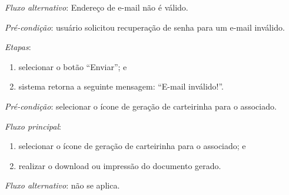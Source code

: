 \documentclass[a4paper,12pt]{article}
\begin{document}
\noindent \textit{Fluxo alternativo}: Endereço de e-mail não é válido.

\noindent \textit{Pré-condição}: usuário solicitou recuperação de senha para um e-mail inválido.

\noindent \textit{Etapas}:

\begin{enumerate}
    \item selecionar o botão ``Enviar''; e
    \item sistema retorna a seguinte mensagem: ``E-mail inválido!''.
\end{enumerate}



\vspace{0.7cm}

\noindent \textit{Pré-condição}: selecionar o ícone de geração de carteirinha para o associado.

\noindent \textit{Fluxo principal}:

\begin{enumerate}
    \item selecionar o ícone de geração de carteirinha para o associado; e
    \item realizar o download ou impressão do documento gerado.
\end{enumerate}

\noindent \textit{Fluxo alternativo}: não se aplica.
\end{document}

